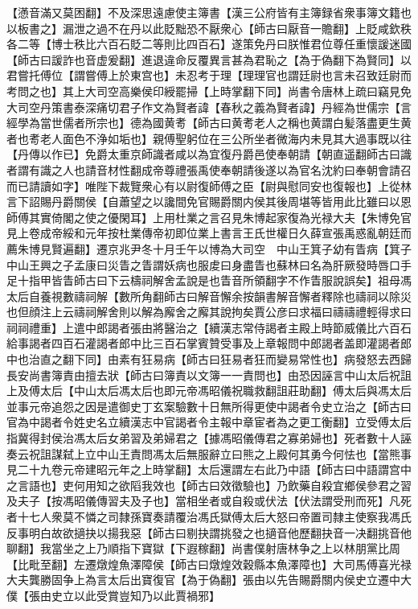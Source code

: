 【懣音滿又莫困翻】不及深思遠慮使主簿書【漢三公府皆有主簿録省衆事簿文籍也以板書之】漏泄之過不在丹以此貶黜恐不厭衆心【師古曰厭音一贍翻】上貶咸欽秩各二等【博士秩比六百石貶二等則比四百石】遂策免丹曰朕惟君位尊任重懷諼迷國【師古曰諼詐也音虚爰翻】進退違命反覆異言甚為君恥之【為于偽翻下為賢同】以君嘗托傅位【謂嘗傅上於東宫也】未忍考于理【理理官也謂廷尉也言未召致廷尉而考問之也】其上大司空高樂侯印綬罷掃【上時掌翻下同】尚書令唐林上疏曰竊見免大司空丹策書泰深痛切君子作文為賢者諱【春秋之義為賢者諱】丹經為世儒宗【言經學為當世儒者所宗也】德為國黄耉【師古曰黄耉老人之稱也黄謂白髪落盡更生黄者也耉老人面色不浄如垢也】親傅聖躬位在三公所坐者微海内未見其大過事既以往【丹傳以作已】免爵太重京師識者咸以為宜復丹爵邑使奉朝請【朝直遥翻師古曰識者謂有識之人也請音材性翻成帝尊禮張禹使奉朝請後遂以為官名沈約曰奉朝會請召而已請讀如字】唯陛下裁覽衆心有以尉復師傅之臣【尉與慰同安也復報也】上從林言下詔賜丹爵關侯【自蕭望之以讒間免官賜爵關内侯其後周堪等皆用此比雖曰以恩師傅其實倚閣之使之優閑耳】上用杜業之言召見朱博起家復為光禄大夫【朱博免官見上卷成帝綏和元年按杜業傳帝初即位業上書言王氏世權日久薛宣張禹惑亂朝廷而薦朱博見賢遍翻】遷京兆尹冬十月壬午以博為大司空　中山王箕子幼有眚病【箕子中山王興之子孟康曰災眚之眚謂妖病也服䖍曰身盡眚也蘇林曰名為肝厥發時唇口手足十指甲皆眚師古曰下云檮祠解舍孟說是也眚音所領翻字不作眚服說誤矣】祖母馮太后自養視數禱祠解【數所角翻師古曰解音懈余按韻書解音懈者釋除也禱祠以除災也但顔注上云禱祠解舍則以解為廨舍之廨其說拘矣賈公彦曰求福曰禱禱禮輕得求曰祠祠禮重】上遣中郎謁者張由將醫治之【續漢志常侍謁者主殿上時節威儀比六百石給事謁者四百石灌謁者郎中比三百石掌賓贊受事及上章報問中郎謁者盖即灌謁者郎中也治直之翻下同】由素有狂易病【師古曰狂易者狂而變易常性也】病發怒去西歸長安尚書簿責由擅去狀【師古曰簿責以文簿一一責問也】由恐因誣言中山太后祝詛上及傅太后【中山太后馮太后也即元帝馮昭儀祝職救翻詛莊助翻】傅太后與馮太后並事元帝追怨之因是遣御史丁玄案驗數十日無所得更使中謁者令史立治之【師古曰官為中謁者令姓史名立續漢志中官謁者令主報中章宦者為之更工衡翻】立受傅太后指冀得封侯治馮太后女弟習及弟婦君之【據馮昭儀傳君之寡弟婦也】死者數十人誣奏云祝詛謀弑上立中山王責問馮太后無服辭立曰熊之上殿何其勇今何怯也【當熊事見二十九卷元帝建昭元年之上時掌翻】太后還謂左右此乃中語【師古曰中語謂宫中之言語也】吏何用知之欲䧟我效也【師古曰效徵驗也】乃飲藥自殺宜鄉侯參君之習及夫子【按馮昭儀傳習夫及子也】當相坐者或自殺或伏法【伏法謂受刑而死】凡死者十七人衆莫不憐之司隸孫寶奏請覆治馮氏獄傅太后大怒曰帝置司隸主使察我馮氏反事明白故欲擿抉以揚我惡【師古曰剔抉謂挑發之也擿音他歷翻抉音一决翻挑音他聊翻】我當坐之上乃順指下寶獄【下遐稼翻】尚書僕射唐林争之上以林朋黨比周【比毗至翻】左遷燉煌魚澤障侯【師古曰燉煌效穀縣本魚澤障也】大司馬傅喜光禄大夫龔勝固争上為言太后出寶復官【為于偽翻】張由以先告賜爵關内侯史立遷中大僕【張由史立以此受賞豈知乃以此賈禍邪】

